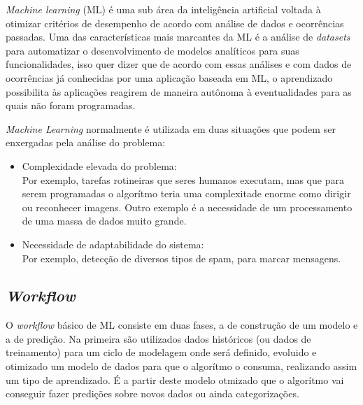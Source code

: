 \textit{Machine learning} (ML) é uma sub área da inteligência artificial voltada à otimizar critérios de desempenho de acordo com análise de dados e ocorrências passadas. \cite{alpaydin2010} Uma das características mais marcantes da ML é a análise de \textit{datasets} para automatizar o desenvolvimento de modelos analíticos para suas funcionalidades, isso quer dizer que de acordo com essas análises e com dados de ocorrências já conhecidas por uma aplicação baseada em ML, o aprendizado possibilita às aplicações reagirem de maneira autônoma à eventualidades para as quais não foram programadas.

\textit{Machine Learning} normalmente é utilizada em duas situações que podem ser enxergadas pela análise do problema:

\begin{itemize}
    \item Complexidade elevada do problema: \\ Por exemplo, tarefas rotineiras que seres humanos executam, mas que para serem programadas o algorítmo teria uma complexitade enorme como dirigir ou reconhecer imagens. Outro exemplo é a necessidade de um processamento de uma massa de dados muito grande.
    \item Necessidade de adaptabilidade do sistema: \\ Por exemplo, detecção de diversos tipos de spam, para marcar mensagens. \\ \cite{shalev2014}
\end{itemize}

\subsection{\textit{Workflow}}
    O \textit{workflow} básico de ML consiste em duas fases, a de construção de um modelo e a de predição. Na primeira são utilizados dados históricos (ou dados de treinamento) para um ciclo de modelagem onde será definido, evoluido e otimizado um modelo de dados para que o algorítmo o consuma, realizando assim um tipo de aprendizado. É a partir deste modelo otmizado que o algorítmo vai conseguir fazer predições sobre novos dados ou ainda categorizações.

